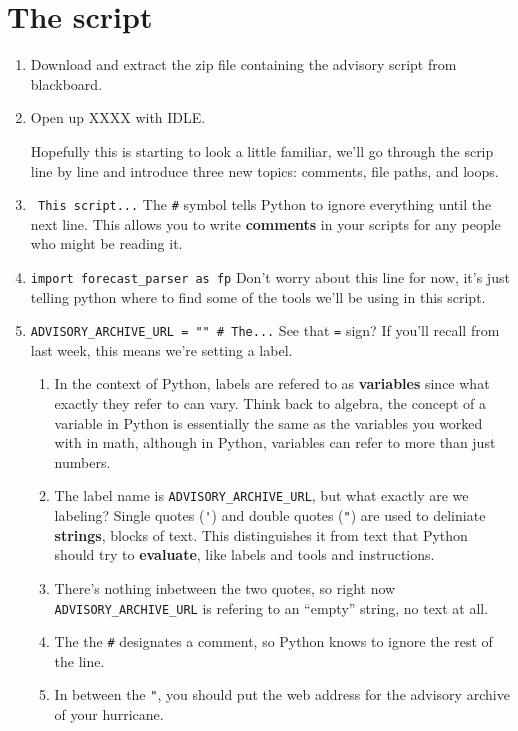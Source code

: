 \documentclass{article}
\begin{document}
\section{The script}
\begin{enumerate}
    \item Download and extract the zip file containing the advisory script from blackboard.  
    \item Open up XXXX with IDLE.  
    
        Hopefully this is starting to look a little familiar, we'll go through the scrip line by line and introduce three new topics: comments, file paths, and loops.
    \item \verb+ This script...+ The \verb+#+ symbol tells Python to ignore everything until the next line.  This allows you to write \textbf{comments} in your scripts for any people who might be reading it.
    \item \verb+import forecast_parser as fp+ Don't worry about this line for now, it's just telling python where to find some of the tools we'll be using in this script.
    \item \verb+ADVISORY_ARCHIVE_URL = "" # The...+ See that \verb+=+ sign?  If you'll recall from last week, this means we're setting a label.  
    \begin{enumerate}
        \item In the context of Python, labels are refered to as \textbf{variables} since what exactly they refer to can vary.  Think back to algebra, the concept of a variable in Python is essentially the same as the variables you worked with in math, although in Python, variables can refer to more than just numbers.  
        \item The label name is \verb+ADVISORY_ARCHIVE_URL+, but what exactly are we labeling?  Single quotes (\verb+'+) and double quotes (\verb+"+) are used to deliniate \textbf{strings}, blocks of text.   This distinguishes it from text that Python should try to \textbf{evaluate}, like labels and tools and instructions.  
        \item There's nothing inbetween the two quotes, so right now \verb+ADVISORY_ARCHIVE_URL+ is refering to an ``empty'' string, no text at all.  
        \item The the \verb+#+ designates a comment, so Python knows to ignore the rest of the line.  
        \item In between the \verb+"+, you should put the web address for the advisory archive of your hurricane.  
    \end{enumerate}

\end{enumerate}
\end{document}
